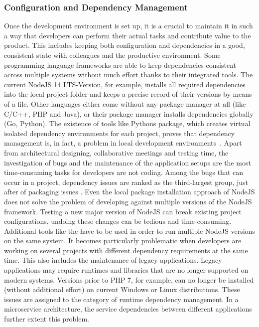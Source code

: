         \subsubsection{Configuration and Dependency Management}\label{sssec::dependency}
        Once the development environment is set up, it is a crucial to maintain it in such a way that developers can perform their actual tasks and contribute value to the product. This includes keeping both configuration and dependencies in a good, consistent state with colleagues and the productive environment. Some programming language frameworks are able to keep dependencies consistent across multiple systems without much effort thanks to their integrated tools. The current NodeJS 14 \ac{LTS}-Version, for example, installs all required dependencies into the local project folder and keeps a precise record of their versions by means of a  file. Other languages either come without any package manager at all (like C/C++, PHP and Java), or their package manager installs dependencies globally (Go, Python). The existence of tools like Pythons  package, which creates virtual isolated dependency environments for each project, proves that dependency management is, in fact, a problem in local development environments~\cite{pythonvenv}. Apart from architectural designing, collaborative meetings and testing time, the investigation of bugs and the maintenance of the application setups are the most time-consuming tasks for developers are not coding. Among the bugs that can occur in a project, dependency issues are ranked as the third-largest group, just after of packaging issues \cite{setuppain}.\newline
        Even the local package installation approach of NodeJS does not solve the problem of developing against multiple versions of the NodeJS framework. Testing a new major version of NodeJS can break existing project configurations, undoing these changes can be tedious and time-consuming. Additional tools like the  have to be used in order to run multiple NodeJS versions on the same system. It becomes particularly problematic when developers are working on several projects with different dependency requirements at the same time. This also includes the maintenance of legacy applications. Legacy applications may require runtimes and libraries that are no longer supported on modern systems. Versions prior to PHP 7, for example, can no longer be installed (without additional effort) on current Windows or Linux distributions. These issues are assigned to the category of runtime dependency management. In a microservice architecture, the service dependencies between different applications further extent this problem. \newline
